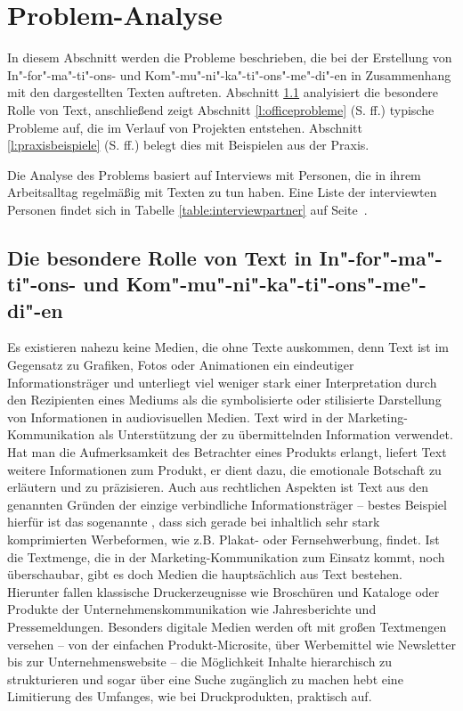 \section{Problem-Analyse}\label{l:problemanalyse}

In diesem Abschnitt werden die Probleme beschrieben, die bei der Erstellung von In"-for"-ma"-ti"-ons- und Kom"-mu"-ni"-ka"-ti"-ons"-me"-di"-en in Zusammenhang mit den dargestellten Texten auftreten. Abschnitt \ref{l:besondererolle} analyisiert die besondere Rolle von Text, anschließend zeigt Abschnitt \ref{l:officeprobleme} (S.\pageref{l:officeprobleme} ff.) typische Probleme auf, die im Verlauf von Projekten entstehen. Abschnitt \ref{l:praxisbeispiele} (S.\pageref{l:praxisbeispiele} ff.) belegt dies mit Beispielen aus der Praxis. 

\bigskip

Die Analyse des Problems basiert auf Interviews mit Personen, die in ihrem Arbeitsalltag regelmäßig mit Texten zu tun haben. Eine Liste der interviewten Personen findet sich in Tabelle \ref{table:interviewpartner} auf Seite~\pageref{table:interviewpartner}.

\subsection{Die besondere Rolle von Text in In"-for"-ma"-ti"-ons- und Kom"-mu"-ni"-ka"-ti"-ons"-me"-di"-en}\label{l:besondererolle}

Es existieren nahezu keine Medien, die ohne Texte auskommen, denn Text ist im Gegensatz zu Grafiken, Fotos oder Animationen ein eindeutiger Informationsträger und unterliegt viel weniger stark einer Interpretation durch den Rezipienten eines Mediums als die symbolisierte oder stilisierte Darstellung von Informationen in audiovisuellen Medien. Text wird in der Marketing-Kommunikation als Unterstützung der zu übermittelnden Information verwendet. Hat man die Aufmerksamkeit des Betrachter eines Produkts erlangt, liefert Text weitere Informationen zum Produkt, er dient dazu, die emotionale Botschaft zu erläutern und zu präzisieren. Auch aus rechtlichen Aspekten ist Text aus den genannten Gründen der einzige verbindliche Informationsträger -- bestes Beispiel hierfür ist das sogenannte , dass sich gerade bei inhaltlich sehr stark komprimierten Werbeformen, wie z.B. Plakat- oder Fernsehwerbung, findet. Ist die Textmenge, die in der Marketing-Kommunikation zum Einsatz kommt, noch überschaubar, gibt es doch Medien die hauptsächlich aus Text bestehen. Hierunter fallen klassische Druckerzeugnisse wie Broschüren und Kataloge oder Produkte der Unternehmenskommunikation wie Jahresberichte und Pressemeldungen. Besonders digitale Medien werden oft mit großen Textmengen versehen -- von der einfachen Produkt-Microsite, über Werbemittel wie Newsletter bis zur Unternehmenswebsite -- die Möglichkeit Inhalte hierarchisch zu strukturieren und sogar über eine Suche zugänglich zu machen hebt eine Limitierung des Umfanges, wie bei Druckprodukten, praktisch auf.

